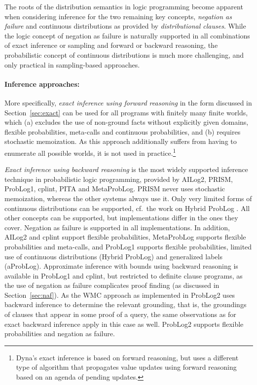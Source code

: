 \documentclass[a4paper]{article}
\begin{document}
The roots of the distribution semantics in logic programming become
apparent when considering inference for the two remaining key
concepts, \emph{negation as failure} and continuous distributions as
provided by \emph{distributional clauses}. While the logic concept of negation as
failure is naturally supported in all combinations of exact inference
or sampling and forward or backward reasoning, the probabilistic
concept of continuous distributions is much more challenging, and only
practical in sampling-based approaches. 




\paragraph{Inference approaches:} More specifically, \emph{exact
  inference using forward reasoning} in the form discussed in Section~\ref{sec:exact} can be used for all programs with finitely
many finite worlds, which (a) excludes the use of 
non-ground facts without explicitly given domains, flexible
probabilities, meta-calls and continuous probabilities, and (b) requires 
stochastic memoization. As this approach additionally suffers from
having to enumerate all possible worlds, it is not used in
practice.\footnote{Dyna's exact inference is based on
  forward reasoning, but uses a different type of algorithm that
  propagates value updates using
  forward reasoning based on an agenda of pending updates.}


\emph{Exact inference using backward reasoning} is the most widely supported
inference technique in probabilistic logic programming, provided by
AILog2, PRISM, ProbLog1, cplint, PITA and MetaProbLog. PRISM never
uses stochastic memoization, whereas the other systems always use
it. Only very limited forms of continuous distributions can be
supported, cf.~the work on Hybrid ProbLog \citep{gutmann:ilp10}. All other
concepts can be supported, but implementations differ in the ones they
cover. Negation as failure is supported in all implementations. In
addition, AILog2
and cplint support flexible probabilities, MetaProbLog
supports flexible probabilities and meta-calls, and ProbLog1 supports
flexible probabilities, limited use of continuous distributions
(Hybrid ProbLog) and generalized labels (aProbLog). 
 Approximate inference with bounds using backward reasoning is available in ProbLog1 and
cplint, but restricted to definite clause programs, as the use of
negation as failure complicates proof finding (as discussed in Section~\ref{sec:naf}). As the WMC approach as implemented in ProbLog2 uses backward inference to determine the relevant
grounding, that is, the groundings of clauses that appear in some
proof of a query, the same observations as for exact backward
inference apply in this case as well. ProbLog2 supports flexible
probabilities and negation as failure.   
\end{document}
